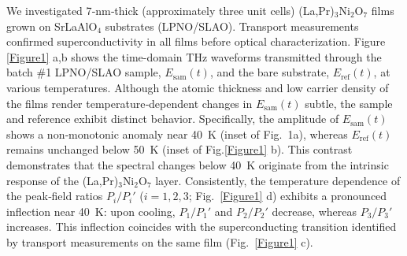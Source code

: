 \documentclass{nature}
\begin{document}
\vspace{18pt}

We investigated 7‑nm‑thick (approximately three unit cells) (La,Pr)$_3$Ni$_2$O$_7$ films grown on SrLaAlO$_4$ substrates (LPNO/SLAO). Transport measurements confirmed superconductivity in all films before optical characterization. Figure \ref{Figure1} a,b shows the time-domain THz waveforms transmitted through the batch \#1 LPNO/SLAO sample, $E_{\mathrm{sam}}(t)$, and the bare substrate, $E_{\mathrm{ref}}(t)$, at various temperatures. Although the atomic thickness and low carrier density of the films render temperature‑dependent changes in $E_{\mathrm{sam}}(t)$ subtle, the sample and reference exhibit distinct behavior. Specifically, the amplitude of $E_{\mathrm{sam}}(t)$ shows a non‑monotonic anomaly near 40 K (inset of Fig. 1a), whereas $E_{\mathrm{ref}}(t)$ remains unchanged below 50 K (inset of Fig.\ref{Figure1} b). This contrast demonstrates that the spectral changes below 40 K originate from the intrinsic response of the (La,Pr)$_3$Ni$_2$O$_7$ layer. Consistently, the temperature dependence of the peak‑field ratios $P_i/P_i'$ ($i=1,2,3$; Fig. \ref{Figure1} d) exhibits a pronounced inflection near 40 K: upon cooling, $P_1/P_1'$ and $P_2/P_2'$ decrease, whereas $P_3/P_3'$ increases. This inflection coincides with the superconducting transition identified by transport measurements on the same film (Fig. \ref{Figure1} c).
\end{document}
